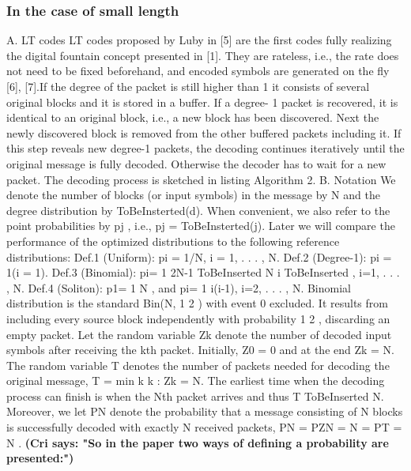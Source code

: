 \documentclass[12pt,a4paper,titlepage,twocolumn]{article}
\newcommand{\cri}[1]{\textcolor{MyColor2}{\textbf{(Cri says: #1)}}}
\begin{document}
\subsubsection{In the case of small length}
A. LT codes
LT codes proposed by Luby in [5] are the first codes fully
realizing the digital fountain concept presented in [1]. They are
rateless, i.e., the rate does not need to be fixed beforehand, and
encoded symbols are generated on the fly [6], [7].If the degree of the packet is still higher than 1 it consists of
several original blocks and it is stored in a buffer. If a degree-
1 packet is recovered, it is identical to an original block, i.e.,
a new block has been discovered. Next the newly discovered
block is removed from the other buffered packets including
it. If this step reveals new degree-1 packets, the decoding
continues iteratively until the original message is fully decoded.
Otherwise the decoder has to wait for a new packet.
The decoding process is sketched in listing Algorithm 2.
B. Notation
We denote the number of blocks (or input symbols) in the
message by N and the degree distribution by ToBeInsterted(d). When
convenient, we also refer to the point probabilities by pj , i.e.,
pj = ToBeInsterted(j). Later we will compare the performance of the optimized
distributions to the following reference distributions:
Def.1 (Uniform): pi = 1/N, i = 1, . . . , N.
Def.2 (Degree-1): pi = 1(i = 1).
Def.3 (Binomial): pi= 1
2N-1
ToBeInserted
N
i
ToBeInserted
, i=1, . . . , N.
Def.4 (Soliton): p1= 1
N , and pi= 1
i(i-1), i=2, . . . , N.
Binomial distribution is the standard Bin(N, 1
2 ) with event
0 excluded. It results from including every source block
independently with probability 1
2 , discarding an empty packet.
Let the random variable Zk denote the number of decoded
input symbols after receiving the kth packet. Initially, Z0 = 0
and at the end Zk = N. The random variable T denotes the
number of packets needed for decoding the original message,
T = min
k
{k : Zk = N}.
The earliest time when the decoding process can finish is when
the Nth packet arrives and thus T ToBeInserted N. Moreover, we let PN
denote the probability that a message consisting of N blocks
is successfully decoded with exactly N received packets,
PN = P{ZN = N} = P{T = N} .
\cri{"So in the paper two ways of defining a probability are presented:"}\\
\end{document}
